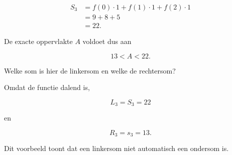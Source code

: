 \documentclass{ximera}
\begin{document}
\begin{oefening}{\oefB\ESS}
\begin{question}
\begin{oplossing}
\[
\begin{aligned}
S_3
&=f(0)\cdot1+f(1)\cdot1+f(2)\cdot1\\
&=9+8+5\\
&=\boxed{22}.
\end{aligned}
\]

De exacte oppervlakte \(A\) voldoet dus aan

\[
\boxed{13<A<22}.
\]
\end{oplossing}
\end{question}

\begin{question}
Welke som is hier de linkersom en welke de rechtersom?

\begin{oplossing}
Omdat de functie dalend is,

\[
\boxed{L_3=S_3=22}
\]

en

\[
\boxed{R_3=s_3=13}.
\]

Dit voorbeeld toont dat een linkersom niet automatisch een ondersom is.
\end{oplossing}
\end{question}

\end{oefening}


\end{document}
